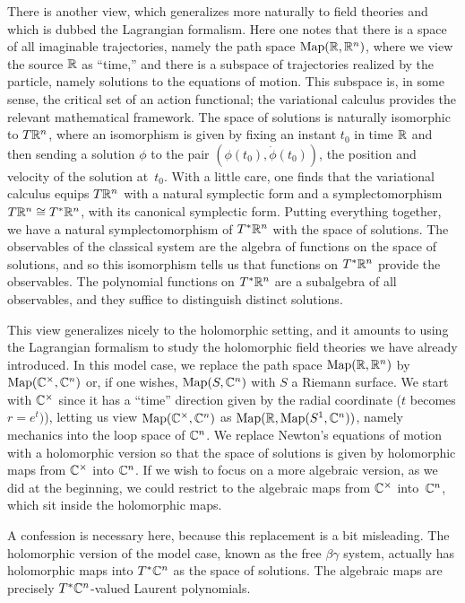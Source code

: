 \documentclass[11pt]{amsart}
\begin{document}
There is another view, which generalizes more naturally to field theories and which is dubbed the Lagrangian formalism.
Here one notes that there is a space of all imaginable trajectories, namely the path space ${\rm Map}(\mathbb R, \mathbb R^n)$, where we view the source $\mathbb R$ as ``time,''
and there is a subspace of trajectories realized by the particle, namely solutions to the equations of motion.
This subspace is, in some sense, the critical set of an action functional; 
the variational calculus provides the relevant mathematical framework.
The space of solutions is naturally isomorphic to $T \mathbb R^n$,
where an isomorphism is given by fixing an instant $t_0$ in time $\mathbb R$ and then sending a solution $\phi$ to the pair $(\phi(t_0), \dot{\phi}(t_0))$, the position and velocity of the solution at~$t_0$.
With a little care, one finds that the variational calculus equips $T \mathbb R^n$ with a natural symplectic form and a symplectomorphism $T\mathbb R^n \cong T^* \mathbb R^n$, with its canonical symplectic form. 
Putting everything together, we have a natural symplectomorphism of $T^* \mathbb R^n$ with the space of solutions.
The observables of the classical system are the algebra of functions on the space of solutions,
and so this isomorphism tells us that functions on $T^* \mathbb R^n$ provide the observables.
The polynomial functions on $T^* \mathbb R^n$ are a subalgebra of all observables, 
and they suffice to distinguish distinct solutions.

This view generalizes nicely to the holomorphic setting,
and it amounts to using the Lagrangian formalism to study the holomorphic field theories we have already introduced.
In this model case, we replace the path space ${\rm Map}(\mathbb R, \mathbb R^n)$ by ${\rm Map}(\mathbb C^\times, \mathbb C^n)$ or, if one wishes, ${\rm Map}(S, \mathbb C^n)$ with $S$ a Riemann surface.
We start with $\mathbb C^\times$ since it has a ``time'' direction given by the radial coordinate ($t$ becomes $r = e^t)$),
letting us view ${\rm Map}(\mathbb C^\times, \mathbb C^n)$ as  ${\rm Map}(\mathbb R, {\rm Map}(S^1,\mathbb C^n))$, namely mechanics into the loop space of $\mathbb C^n$.
We replace Newton's equations of motion with a holomorphic version
so that the space of solutions is given by holomorphic maps from $\mathbb C^\times$ into $\mathbb C^n$.
If we wish to focus on a more algebraic version, as we did at the beginning,
we could restrict to the algebraic maps from $\mathbb C^\times$ into~$\mathbb C^n$,
which sit inside the holomorphic maps.

A confession is necessary here, because this replacement is a bit misleading.
The holomorphic version of the model case, known as the free $\beta\gamma$ system,
actually has holomorphic maps into $T^* \mathbb C^n$ as the space of solutions.
The algebraic maps are precisely $T^* \mathbb C^n$-valued Laurent polynomials.
\end{document}
